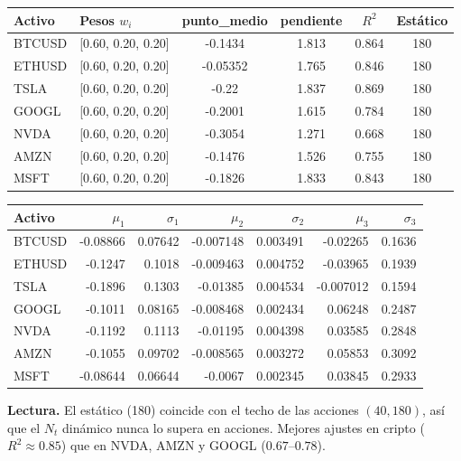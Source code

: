 \documentclass[11pt,a4paper]{article}
\begin{document}
\begin{center}\end{center}
\begin{center}\small\setlength{\tabcolsep}{5pt}
\begin{tabular}{llcccc}\toprule
Activo & Pesos $w_i$ & punto\_medio & pendiente & $R^2$ & Estático \\\midrule
BTCUSD & [0.60, 0.20, 0.20] & -0.1434 & 1.813 & 0.864 & 180 \\
ETHUSD & [0.60, 0.20, 0.20] & -0.05352 & 1.765 & 0.846 & 180 \\
TSLA & [0.60, 0.20, 0.20] & -0.22 & 1.837 & 0.869 & 180 \\
GOOGL & [0.60, 0.20, 0.20] & -0.2001 & 1.615 & 0.784 & 180 \\
NVDA & [0.60, 0.20, 0.20] & -0.3054 & 1.271 & 0.668 & 180 \\
AMZN & [0.60, 0.20, 0.20] & -0.1476 & 1.526 & 0.755 & 180 \\
MSFT & [0.60, 0.20, 0.20] & -0.1826 & 1.833 & 0.843 & 180 \\
\bottomrule\end{tabular}

\medskip
\begin{tabular}{lrrrrrr}\toprule
Activo & $\mu_1$ & $\sigma_1$ & $\mu_2$ & $\sigma_2$ & $\mu_3$ & $\sigma_3$ \\\midrule
BTCUSD & -0.08866 & 0.07642 & -0.007148 & 0.003491 & -0.02265 & 0.1636 \\
ETHUSD & -0.1247 & 0.1018 & -0.009463 & 0.004752 & -0.03965 & 0.1939 \\
TSLA & -0.1896 & 0.1303 & -0.01385 & 0.004534 & -0.007012 & 0.1594 \\
GOOGL & -0.1011 & 0.08165 & -0.008468 & 0.002434 & 0.06248 & 0.2487 \\
NVDA & -0.1192 & 0.1113 & -0.01195 & 0.004398 & 0.03585 & 0.2848 \\
AMZN & -0.1055 & 0.09702 & -0.008565 & 0.003272 & 0.05853 & 0.3092 \\
MSFT & -0.08644 & 0.06644 & -0.0067 & 0.002345 & 0.03845 & 0.2933 \\
\bottomrule\end{tabular}\end{center}
\textbf{Lectura.} El estático (180) coincide con el techo de las acciones $(40,180)$, así que el $N_t$ dinámico nunca lo supera en acciones. Mejores ajustes en cripto ($R^2\approx0.85$) que en NVDA, AMZN y GOOGL ($0.67$--$0.78$).
\newpage
\end{document}
